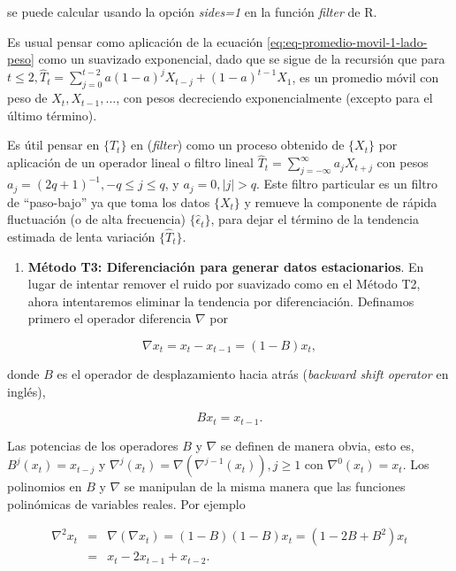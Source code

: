\documentclass[12pt,]{krantz}
\providecommand{\tightlist}{%
  \setlength{\itemsep}{0pt}\setlength{\parskip}{0pt}}
\theoremstyle{definition}
\theoremstyle{definition}
\theoremstyle{definition}
\theoremstyle{remark}
\begin{document}
se puede calcular usando la opción \emph{sides=1} en la función
\emph{filter} de R.

Es usual pensar como aplicación de la ecuación
\eqref{eq:eq-promedio-movil-1-lado-peso} como un suavizado exponencial,
dado que se sigue de la recursión que para
\(t\leq2, \hat{T}_t=\sum_{j=0}^{t-2}a(1-a)^jX_{t-j}+(1-a)^{t-1}X_1\), es
un promedio móvil con peso de \(X_t,X_{t-1},\ldots\), con pesos
decreciendo exponencialmente (excepto para el último término).

Es útil pensar en \(\{\hat{T}_t\}\) en (\emph{filter}) como un proceso
obtenido de \(\{X_t\}\) por aplicación de un operador lineal o filtro
lineal \(\hat{T}_t=\sum_{j=-\infty}^{\infty}a_jX_{t+j}\) con pesos
\(a_j=(2q+1)^{-1},-q\leq j\leq q\), y \(a_j=0,|j|>q\). Este filtro
particular es un filtro de ``paso-bajo'' ya que toma los datos
\(\{X_t\}\) y remueve la componente de rápida fluctuación (o de alta
frecuencia) \(\{\hat{\epsilon}_t\}\), para dejar el término de la
tendencia estimada de lenta variación \(\{\hat{T}_t\}\).

\begin{enumerate}
\def\labelenumi{\arabic{enumi}.}
\setcounter{enumi}{2}
\tightlist
\item
  \textbf{Método T3: Diferenciación para generar datos estacionarios}.
  En lugar de intentar remover el ruido por suavizado como en el Método
  T2, ahora intentaremos eliminar la tendencia por diferenciación.
  Definamos primero el operador diferencia \(\nabla\) por
\end{enumerate}

\begin{equation}
  \nabla x_t = x_t-x_{t-1}=(1-B)x_t,
\label{eq:eq-operador-diferencia}
\end{equation}

donde \(B\) es el operador de desplazamiento hacia atrás (\emph{backward
shift operator} en inglés),

\begin{equation}
  Bx_t=x_{t-1}.
\label{eq:eq-backward-shift-operator}
\end{equation}

Las potencias de los operadores \(B\) y \(\nabla\) se definen de manera
obvia, esto es, \(B^j(x_t)=x_{t-j}\) y
\(\nabla^j(x_t)=\nabla(\nabla^{j-1}(x_t)),j\geq1\) con
\(\nabla^0(x_t)=x_t\). Los polinomios en \(B\) y \(\nabla\) se manipulan
de la misma manera que las funciones polinómicas de variables reales.
Por ejemplo

\begin{eqnarray*}
  \nabla^2x_t &=& \nabla(\nabla x_t) = (1-B)(1-B)x_t = (1-2B+B^2)x_t \\
              &=& x_t-2x_{t-1}+x_{t-2}.
\end{eqnarray*}
\end{document}
